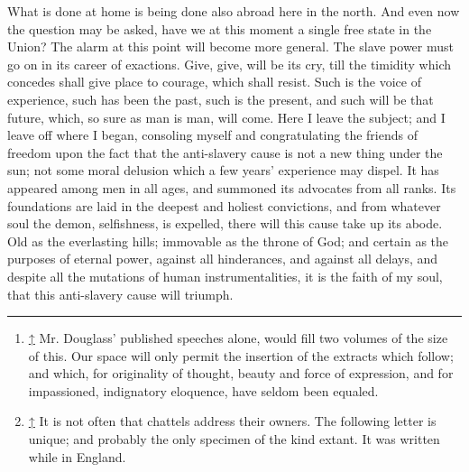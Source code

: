 What is done at home is being done also abroad here in the north. And
even now the question may be asked, have we at this moment a single free
state in the Union? The alarm at this point will become more general.
The slave power must go on in its career of exactions. Give, give, will
be its cry, till the timidity which concedes shall give place to
courage, which shall resist. Such is the voice of experience, such has
been the past, such is the present, and such will be that future, which,
so sure as man is man, will come. Here I leave the subject; and I leave
off where I began, consoling myself and congratulating the friends of
freedom upon the fact that the anti-slavery cause is not a new thing
under the sun; not some moral delusion which a few years' experience may
dispel. It has appeared among men in all ages, and summoned its
advocates from all ranks. Its foundations are laid in the deepest and
holiest convictions, and from whatever soul the demon, selfishness, is
expelled, there will this cause take up its abode. Old as the
everlasting hills; immovable as the throne of God; and certain as the
purposes of eternal power, against all hinderances, and against all
delays, and despite all the mutations of human instrumentalities, it is
the faith of my soul, that this anti-slavery cause will triumph.

\begin{center}\rule{0.5\linewidth}{\linethickness}\end{center}

\begin{enumerate}
\item
  \hypertarget{cite_note-1}{}

  {\protect\hyperlink{cite_ref-1}{↑}} {Mr. Douglass' published speeches
  alone, would fill two volumes of the size of this. Our space will only
  permit the insertion of the extracts which follow; and which, for
  originality of thought, beauty and force of expression, and for
  impassioned, indignatory eloquence, have seldom been equaled.}
\item
  \hypertarget{cite_note-2}{}

  {\protect\hyperlink{cite_ref-2}{↑}} {It is not often that chattels
  address their owners. The following letter is unique; and probably the
  only specimen of the kind extant. It was written while in England.}
\end{enumerate}
